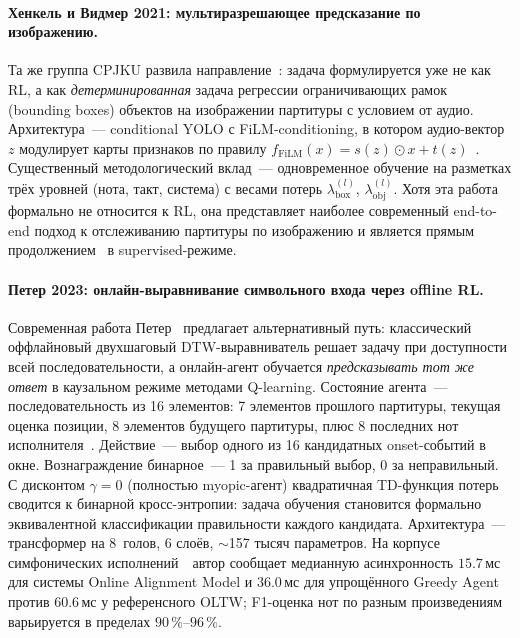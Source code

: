 \paragraph*{Хенкель и Видмер 2021: мультиразрешающее предсказание
по изображению.} Та же группа CPJKU развила
направление~\cite{Henkel2021}: задача формулируется уже не как
RL, а как \textit{детерминированная} задача регрессии
ограничивающих рамок (bounding boxes) объектов на изображении
партитуры с условием от аудио. Архитектура~--- conditional
YOLO с FiLM-conditioning, в котором аудио-вектор $z$ модулирует
карты признаков по правилу $f_{\text{FiLM}}(x) = s(z)\odot x +
t(z)$~\cite[уравн.~1]{Henkel2021}. Существенный методологический
вклад~--- одновременное обучение на разметках трёх уровней
(нота, такт, система) с весами потерь $\lambda^{(l)}_{\text{box}}$,
$\lambda^{(l)}_{\text{obj}}$. Хотя эта работа формально не
относится к RL, она представляет наиболее современный
end-to-end подход к отслеживанию партитуры по изображению и
является прямым продолжением~\cite{Dorfer2018RL} в supervised-режиме.

\paragraph*{Петер 2023: онлайн-выравнивание символьного входа
через offline RL.} Современная работа Петер~\cite{Peter2023}
предлагает альтернативный путь: классический оффлайновый
двухшаговый DTW-выравниватель решает задачу при доступности всей
последовательности, а онлайн-агент обучается \textit{предсказывать
тот же ответ} в каузальном режиме методами Q-learning. Состояние
агента~--- последовательность из 16 элементов: 7 элементов
прошлого партитуры, текущая оценка позиции, 8 элементов будущего
партитуры, плюс 8 последних нот исполнителя~\cite[\S~III]{Peter2023}.
Действие~--- выбор одного из 16 кандидатных onset-событий в окне.
Вознаграждение бинарное~--- 1 за правильный выбор, 0 за
неправильный. С дисконтом $\gamma=0$ (полностью myopic-агент)
квадратичная TD-функция потерь сводится к бинарной
кросс-энтропии: задача обучения становится формально
эквивалентной классификации правильности каждого кандидата.
Архитектура~--- трансформер на 8~голов, 6 слоёв,
$\sim$157 тысяч параметров. На корпусе симфонических
исполнений~\cite[\S~IV]{Peter2023}~автор сообщает медианную
асинхронность $15.7$\,мс для системы Online Alignment Model и
$36.0$\,мс для упрощённого Greedy Agent против $60.6$\,мс у
референсного OLTW; F1-оценка нот по разным произведениям
варьируется в пределах $90\,\%$--$96\,\%$.

